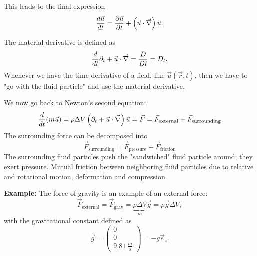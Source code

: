 This leads to the final expression
\begin{equation}
\frac{d \vec{u}}{d t} = \frac{\partial \vec{u}}{\partial t} + \left(\vec{u}\cdot\vec{\nabla}\right)\vec{u}.
\end{equation}
\begin{framed}
The material derivative is defined as
\begin{equation}
\frac{d }{d t}\partial_t+\vec{u}\cdot\vec{\nabla}=\frac{D}{Dt}=D_t.
\end{equation}
Whenever we have the time derivative of a field, like $\vec{u}(\vec{r},t)$, then we have to "go with the fluid particle" and use the material derivative.
\end{framed}
We now go back to Newton's second equation:
\begin{equation}
\frac{d }{d t}(m\vec{u}) = \rho\Delta V\left(\partial_t + \vec{u}\cdot\vec{\nabla}\right)\vec{u} = \vec{F} = \vec{F}_\mathrm{external} + \vec{F}_\mathrm{surrounding}
\end{equation}
The surrounding force can be decomposed into
\begin{equation}
\vec{F}_\mathrm{surrounding} = \vec{F}_\mathrm{pressure} + \vec{F}_\mathrm{friction}
\end{equation}
The surrounding fluid particles push the "sandwiched" fluid particle around; they exert pressure. Mutual friction between neighboring fluid particles due to relative and rotational motion, deformation and compression.

\begin{framed}
\textbf{Example:} The force of gravity is an example of an external force:
\begin{equation}
\vec{F}_\text{external} = \vec{F}_\text{grav} = \underbrace{\rho\Delta V}_m\vec{g}=\rho\vec{g}\Delta V,
\end{equation}
with the gravitational constant defined as
\begin{equation}
\vec{g} = \begin{pmatrix}
0\\0\\\SI{9.81}{\frac{m}{s}}
\end{pmatrix} = -g\vec{e}_z.
\end{equation}
\end{framed}

